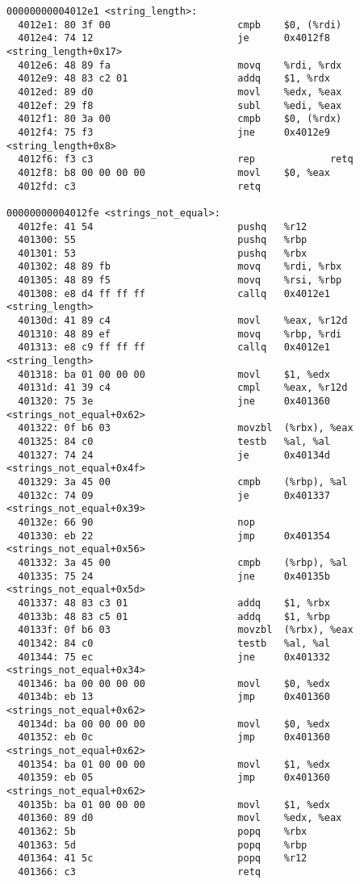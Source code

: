 \documentclass{scrartcl}
\begin{document}
\begin{lstlisting}
00000000004012e1 <string_length>:
  4012e1: 80 3f 00                      cmpb    $0, (%rdi)
  4012e4: 74 12                         je      0x4012f8 <string_length+0x17>
  4012e6: 48 89 fa                      movq    %rdi, %rdx
  4012e9: 48 83 c2 01                   addq    $1, %rdx
  4012ed: 89 d0                         movl    %edx, %eax
  4012ef: 29 f8                         subl    %edi, %eax
  4012f1: 80 3a 00                      cmpb    $0, (%rdx)
  4012f4: 75 f3                         jne     0x4012e9 <string_length+0x8>
  4012f6: f3 c3                         rep             retq
  4012f8: b8 00 00 00 00                movl    $0, %eax
  4012fd: c3                            retq

00000000004012fe <strings_not_equal>:
  4012fe: 41 54                         pushq   %r12
  401300: 55                            pushq   %rbp
  401301: 53                            pushq   %rbx
  401302: 48 89 fb                      movq    %rdi, %rbx
  401305: 48 89 f5                      movq    %rsi, %rbp
  401308: e8 d4 ff ff ff                callq   0x4012e1 <string_length>
  40130d: 41 89 c4                      movl    %eax, %r12d
  401310: 48 89 ef                      movq    %rbp, %rdi
  401313: e8 c9 ff ff ff                callq   0x4012e1 <string_length>
  401318: ba 01 00 00 00                movl    $1, %edx
  40131d: 41 39 c4                      cmpl    %eax, %r12d
  401320: 75 3e                         jne     0x401360 <strings_not_equal+0x62>
  401322: 0f b6 03                      movzbl  (%rbx), %eax
  401325: 84 c0                         testb   %al, %al
  401327: 74 24                         je      0x40134d <strings_not_equal+0x4f>
  401329: 3a 45 00                      cmpb    (%rbp), %al
  40132c: 74 09                         je      0x401337 <strings_not_equal+0x39>
  40132e: 66 90                         nop
  401330: eb 22                         jmp     0x401354 <strings_not_equal+0x56>
  401332: 3a 45 00                      cmpb    (%rbp), %al
  401335: 75 24                         jne     0x40135b <strings_not_equal+0x5d>
  401337: 48 83 c3 01                   addq    $1, %rbx
  40133b: 48 83 c5 01                   addq    $1, %rbp
  40133f: 0f b6 03                      movzbl  (%rbx), %eax
  401342: 84 c0                         testb   %al, %al
  401344: 75 ec                         jne     0x401332 <strings_not_equal+0x34>
  401346: ba 00 00 00 00                movl    $0, %edx
  40134b: eb 13                         jmp     0x401360 <strings_not_equal+0x62>
  40134d: ba 00 00 00 00                movl    $0, %edx
  401352: eb 0c                         jmp     0x401360 <strings_not_equal+0x62>
  401354: ba 01 00 00 00                movl    $1, %edx
  401359: eb 05                         jmp     0x401360 <strings_not_equal+0x62>
  40135b: ba 01 00 00 00                movl    $1, %edx
  401360: 89 d0                         movl    %edx, %eax
  401362: 5b                            popq    %rbx
  401363: 5d                            popq    %rbp
  401364: 41 5c                         popq    %r12
  401366: c3                            retq
\end{lstlisting}
\end{document}
